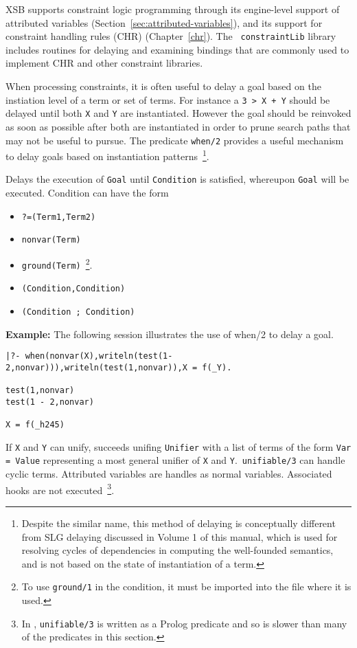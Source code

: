 XSB supports constraint logic programming through its engine-level
support of attributed variables
(Section~\ref{sec:attributed-variables}), and its support for
constraint handling rules (CHR) (Chapter~\ref{chr}).  The {\tt
constraintLib} library includes routines for delaying and examining
bindings that are commonly used to implement CHR and other constraint
libraries.

When processing constraints, it is often useful to delay a goal based
on the instiation level of a term or set of terms.  For instance a
{\tt 3 > X + Y} should be delayed until both {\tt X} and {\tt Y} are
instantiated.  However the goal should be reinvoked as soon as
possible after both are instantiated in order to prune search paths
that may not be useful to pursue.  The predicate {\tt when/2} provides
a useful mechanism to delay goals based on instantiation
patterns~\footnote{Despite the similar name, this method of delaying
is conceptually different from SLG {\sc delaying} discussed in Volume
1 of this manual, which is used for resolving cycles of dependencies
in computing the well-founded semantics, and is not based on the state
of instantiation of a term.}.

\begin{description}
%
Delays the execution of {\tt Goal} until {\tt Condition} is satisfied,
whereupon {\tt Goal} will be executed.  Condition can have the form
\begin{itemize}
\item {\tt ?=(Term1,Term2)}
\item {\tt nonvar(Term)}
\item {\tt ground(Term)}~\footnote{To use {\tt ground/1} in the
condition, it must be imported into the file where it is used.}. 
\item {\tt (Condition,Condition)}
\item {\tt (Condition ; Condition)}
\end{itemize}

{\bf Example:} The following session illustrates the use of when/2 to
delay a goal.
%
\begin{small}
\begin{verbatim}
|?- when(nonvar(X),writeln(test(1-2,nonvar))),writeln(test(1,nonvar)),X = f(_Y).

test(1,nonvar)
test(1 - 2,nonvar)

X = f(_h245)
\end{verbatim}
\end{small}

%
If {\tt X} and {\tt Y} can unify, succeeds unifing {\tt Unifier} with
a list of terms of the form {\tt Var = Value} representing a most
general unifier of {\tt X} and {\tt Y}.\  {\tt unifiable/3} can handle
cyclic terms. Attributed variables are handles as normal
variables. Associated hooks are not executed~\footnote{In \version ,
  {\tt unifiable/3} is written as a Prolog predicate and so is slower
  than many of the predicates in this section.}.

\end{description}

